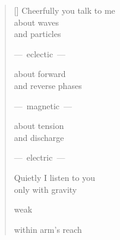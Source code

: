 \documentclass[12pt,a4paper]{article}
\begin{document}
\thispagestyle{empty}

\poemtitle{}

\settowidth{\versewidth}{Cheerfully you talk to me}

\bigskip

\begin{verse}[\versewidth]
  Cheerfully you talk to me \\
  about waves \\
  and particles

  ---~eclectic~---

  about forward \\
  and reverse phases

  ---~magnetic~---

  about tension \\
  and discharge

  ---~electric~---

  Quietly I listen to you \\
  only with gravity

  weak

  within arm's reach
\end{verse}
\end{document}
